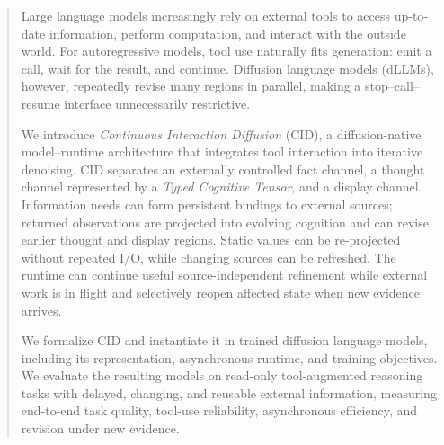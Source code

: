 \begin{abstract}
Large language models increasingly rely on external tools to access up-to-date information, perform computation, and interact with the outside world. For autoregressive models, tool use naturally fits generation: emit a call, wait for the result, and continue. Diffusion language models (dLLMs), however, repeatedly revise many regions in parallel, making a stop--call--resume interface unnecessarily restrictive.

We introduce \emph{Continuous Interaction Diffusion} (CID), a diffusion-native model--runtime architecture that integrates tool interaction into iterative denoising. CID separates an externally controlled fact channel, a thought channel represented by a \emph{Typed Cognitive Tensor}, and a display channel. Information needs can form persistent bindings to external sources; returned observations are projected into evolving cognition and can revise earlier thought and display regions. Static values can be re-projected without repeated I/O, while changing sources can be refreshed. The runtime can continue useful source-independent refinement while external work is in flight and selectively reopen affected state when new evidence arrives.

We formalize CID and instantiate it in trained diffusion language models, including its representation, asynchronous runtime, and training objectives. We evaluate the resulting models on read-only tool-augmented reasoning tasks with delayed, changing, and reusable external information, measuring end-to-end task quality, tool-use reliability, asynchronous efficiency, and revision under new evidence.
\end{abstract}
